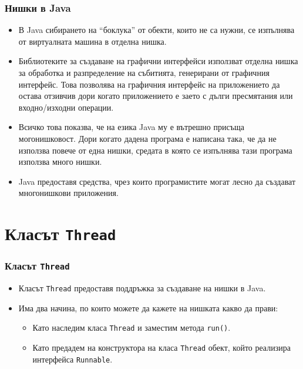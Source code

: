 \documentclass[ignorenonframetext, hyperref=unicode,compress]{beamer}
\begin{document}
\begin{frame}[containsverbatim]
\frametitle{Нишки в Java}
\begin{itemize}
\item В Java сибирането на ``боклука'' от обекти, които не са нужни, се
изпълнява от виртуалната машина в отделна нишка.
\item Библиотеките за създаване на графични интерфейси използват отделна нишка
за обработка и разпределение на събитията, генерирани от графичния интерфейс.
Това позволява на графичния интерфейс на приложението да остава отзивчив дори
когато приложението е заето с дълги пресмятания или входно/изходни операции.
\item Всичко това показва, че на езика Java му е вътрешно присъща
могонишковост. Дори когато дадена програма е написана така, че да не използва
повече от една нишки, средата в която се изпълнява тази програма използва много
нишки.
\item Java предоставя средства, чрез които програмистите могат лесно да създават
многонишкови приложения.
\end{itemize}
\end{frame}

\section{Класът \lstinline{Thread}}
\begin{frame}[containsverbatim]
\frametitle{Класът \lstinline{Thread}}
\begin{itemize}
\item Класът \lstinline{Thread} предоставя поддръжка за създаване на
нишки в Java.
\item Има два начина, по които можете да кажете на нишката какво да прави:
\begin{itemize}
  \item Като наследим класа \lstinline{Thread} и заместим метода
  \lstinline{run()}.
  \item Като предадем на конструктора на класа \lstinline{Thread} обект, който
  реализира интерфейса \lstinline{Runnable}.
\end{itemize}
\end{itemize}
\end{frame}
\end{document}
